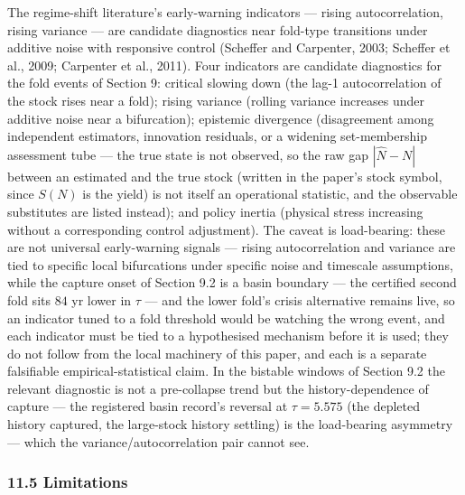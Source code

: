 \documentclass[11pt]{article}
\begin{document}
The regime-shift literature's early-warning indicators --- rising
autocorrelation, rising variance --- are candidate diagnostics near
fold-type transitions under additive noise with responsive control
(Scheffer and Carpenter, 2003; Scheffer et al., 2009; Carpenter et al.,
2011). Four indicators are candidate diagnostics for the fold events of
Section 9: critical slowing down (the lag-1 autocorrelation of the stock
rises near a fold); rising variance (rolling variance increases under
additive noise near a bifurcation); epistemic divergence (disagreement
among independent estimators, innovation residuals, or a widening
set-membership assessment tube --- the true state is not observed, so
the raw gap \(|\hat N - N|\) between an estimated and the true stock
(written in the paper's stock symbol, since \(S(N)\) is the yield) is
not itself an operational statistic, and the observable substitutes are
listed instead); and policy inertia (physical stress increasing without
a corresponding control adjustment). The caveat is load-bearing: these
are not universal early-warning signals --- rising autocorrelation and
variance are tied to specific local bifurcations under specific noise
and timescale assumptions, while the capture onset of Section 9.2 is a
basin boundary --- the certified second fold sits \(84\) yr lower in
\(\tau\) --- and the lower fold's crisis alternative remains live, so an
indicator tuned to a fold threshold would be watching the wrong event,
and each indicator must be tied to a hypothesised mechanism before it is
used; they do not follow from the local machinery of this paper, and
each is a separate falsifiable empirical-statistical claim. In the
bistable windows of Section 9.2 the relevant diagnostic is not a
pre-collapse trend but the history-dependence of capture --- the
registered basin record's reversal at \(\tau = 5.575\) (the depleted
history captured, the large-stock history settling) is the load-bearing
asymmetry --- which the variance/autocorrelation pair cannot see.

\subsubsection{11.5 Limitations}\label{limitations}
\end{document}
